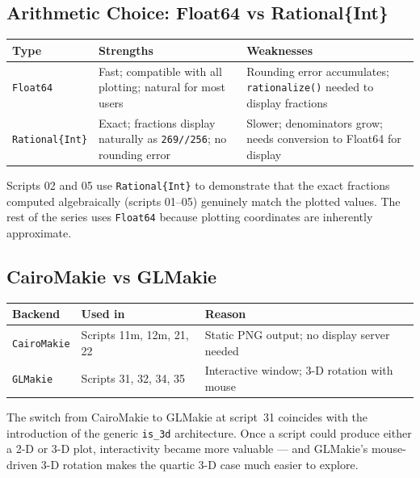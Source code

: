 \documentclass[12pt, a4paper]{article}
\newcommand{\cd}[1]{\texttt{#1}}
\begin{document}
\subsection{Arithmetic Choice: Float64 vs Rational\{Int\}}

\begin{center}
\begin{tabular}{p{1.5cm}p{4.5cm}p{5cm}}
\toprule
Type & Strengths & Weaknesses \\
\midrule
\cd{Float64} &
  Fast; compatible with all plotting; natural for most users &
  Rounding error accumulates; \cd{rationalize()} needed
  to display fractions \\[6pt]
\cd{Rational\{Int\}} &
  Exact; fractions display naturally as \cd{269//256};
  no rounding error &
  Slower; denominators grow; needs conversion to Float64
  for display \\
\bottomrule
\end{tabular}
\end{center}

Scripts 02 and 05 use \cd{Rational\{Int\}} to demonstrate
that the exact fractions computed algebraically
(scripts 01--05) genuinely match the plotted values.
The rest of the series uses \cd{Float64} because
plotting coordinates are inherently approximate.

\subsection{CairoMakie vs GLMakie}

\begin{center}
\begin{tabular}{lll}
\toprule
Backend & Used in & Reason \\
\midrule
\cd{CairoMakie} & Scripts 11m, 12m, 21, 22 &
  Static PNG output; no display server needed \\
\cd{GLMakie} & Scripts 31, 32, 34, 35 &
  Interactive window; 3-D rotation with mouse \\
\bottomrule
\end{tabular}
\end{center}

The switch from CairoMakie to GLMakie at script~31
coincides with the introduction of the generic
\cd{is\_3d} architecture.
Once a script could produce either a 2-D or 3-D plot,
interactivity became more valuable --- and GLMakie's
mouse-driven 3-D rotation makes the quartic 3-D case
much easier to explore.
\end{document}
